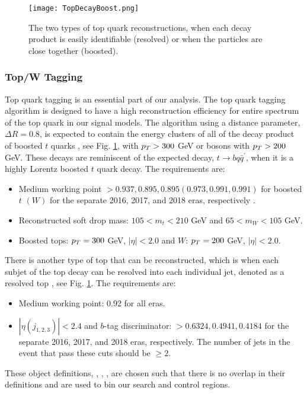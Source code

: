\begin{figure}
 	\centering
	\texttt{[image: TopDecayBoost.png]}
 	\caption[Top Decays]{The two types of top quark reconstructions, when each decay product is easily identifiable (resolved) or when the particles are close together (boosted).}
 	\label{TopDecays} 
\end{figure}

\subsubsection{Top/W Tagging}\label{TopTagging}
Top quark tagging is an essential part of our analysis. The top quark tagging algorithm is designed to have a high reconstruction efficiency for entire \pt{} spectrum of the top quark in our signal models. The \antikt{} algorithm using a distance parameter, $\Delta R=0.8$, is expected to contain the energy clusters of all of the decay product of boosted $t$ quarks \cite{noauthor_top_nodate, aad_identification_2016}, see Fig. \ref{TopDecays}, with $p_{T}>300$ GeV or \W{} bosons with $p_{T}>200$ GeV. These decays are reminiscent of the expected decay, $t\rightarrow bq\bar{q}^\prime$, when it is a highly Lorentz boosted $t$ quark decay. The requirements are:
\begin{itemize}
	\item Medium working point $>0.937, 0.895, 0.895 (0.973, 0.991, 0.991)$ for boosted $t$ $(W)$ for the separate 2016, 2017, and 2018 eras, respectively \cite{ganin_unsupervised_2015}.
	\item Reconstructed soft drop\cite{larkoski_soft_2014, dasgupta_towards_2013} mass: $105<m_t<210$ GeV and $65<m_W<105$ GeV.
	\item Boosted tops: $p_{T}=300$ GeV, $|\eta|<2.0$ and $W$: $p_{T}=200$ GeV, $|\eta|<2.0$.
\end{itemize}

There is another type of top that can be reconstructed, which is when each subjet of the top decay can be resolved into each individual jet, denoted as a resolved top \cite{ganin_unsupervised_2015}, see Fig. \ref{TopDecays}. The requirements are:
\begin{itemize}
	\item Medium working point: 0.92 for all eras.
	\item $|\eta(j_{1,2,3})|<2.4$ and $b$-tag discriminator: $>0.6324, 0.4941, 0.4184$ for the separate 2016, 2017, and 2018 eras, respectively. The number of jets in the event that pass these cuts should be $\geq2$.
\end{itemize}
These object definitions, \nt, \nw, \nrt, are chosen such that there is no overlap in their definitions and are used to bin our search and control regions. 

